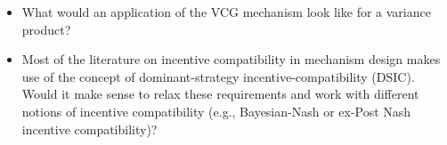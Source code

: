 \documentclass{article}
\begin{document}
\begin{itemize}
\item What would an application of the VCG mechanism look like for a variance product?
\item Most of the literature on incentive compatibility in mechanism design makes use of the concept of dominant-strategy incentive-compatibility (DSIC). Would it make sense to relax these requirements and work with different notions of incentive compatibility (e.g., Bayesian-Nash or ex-Post Nash incentive compatibility)?
\end{itemize}


\end{document}
